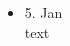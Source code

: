 \begin{multicols}{2}


    \begin{itemize}

        \item[]5. Jan\\
        text

    \end{itemize}

\end{multicols}
